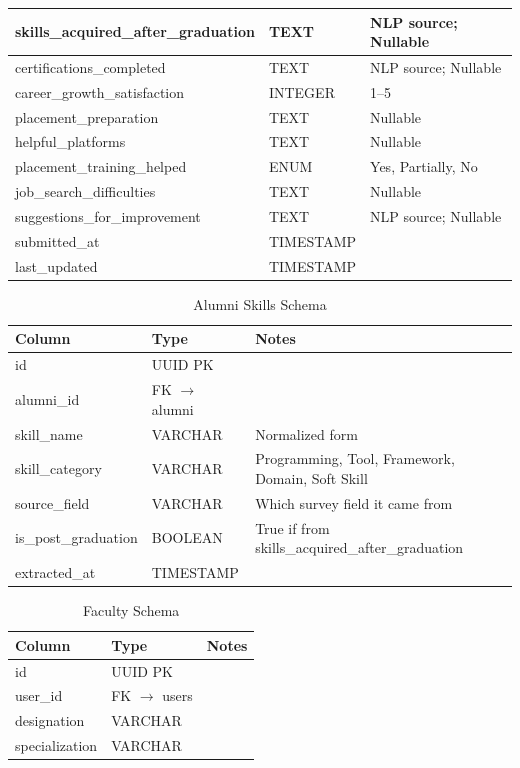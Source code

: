 {\begin{longtable}{|p{}|p{}|p{}|}
    skills\_acquired\_\allowbreak after\_graduation & TEXT & NLP source; Nullable \\ \hline
    certifications\_completed & TEXT & NLP source; Nullable \\ \hline
    career\_growth\_satisfaction & INTEGER & 1--5 \\ \hline
    placement\_preparation & TEXT & Nullable \\ \hline
    helpful\_platforms & TEXT & Nullable \\ \hline
    placement\_training\_helped & ENUM & Yes, Partially, No \\ \hline
    job\_search\_difficulties & TEXT & Nullable \\ \hline
    suggestions\_for\_improvement & TEXT & NLP source; Nullable \\ \hline
    submitted\_at & TIMESTAMP & \\ \hline
    last\_updated & TIMESTAMP & \\ \hline
\end{longtable}

\begin{table}[h]
    \centering
    \caption{Alumni Skills Schema}
    \begin{tabularx}{\textwidth}{|p{}|p{}|X|}
        \hline
        \textbf{Column} & \textbf{Type} & \textbf{Notes} \\ \hline
        id & UUID PK & \\ \hline
        alumni\_id & FK $\rightarrow$ alumni & \\ \hline
        skill\_name & VARCHAR & Normalized form \\ \hline
        skill\_category & VARCHAR & Programming, Tool, Framework, Domain, Soft Skill \\ \hline
        source\_field & VARCHAR & Which survey field it came from \\ \hline
        is\_post\_graduation & BOOLEAN & True if from skills\_acquired\_\allowbreak after\_graduation \\ \hline
        extracted\_at & TIMESTAMP & \\ \hline
    \end{tabularx}
\end{table}

\begin{table}[h]
    \centering
    \caption{Faculty Schema}
    \begin{tabularx}{\textwidth}{|p{}|p{}|X|}
        \hline
        \textbf{Column} & \textbf{Type} & \textbf{Notes} \\ \hline
        id & UUID PK & \\ \hline
        user\_id & FK $\rightarrow$ users & \\ \hline
        designation & VARCHAR & \\ \hline
        specialization & VARCHAR & \\ \hline
    \end{tabularx}
\end{table}

}

